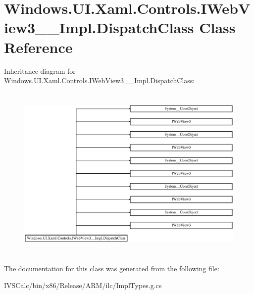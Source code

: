 \hypertarget{class_windows_1_1_u_i_1_1_xaml_1_1_controls_1_1_i_web_view3_____impl_1_1_dispatch_class}{}\section{Windows.\+U\+I.\+Xaml.\+Controls.\+I\+Web\+View3\+\_\+\+\_\+\+Impl.\+Dispatch\+Class Class Reference}
\label{class_windows_1_1_u_i_1_1_xaml_1_1_controls_1_1_i_web_view3_____impl_1_1_dispatch_class}
Inheritance diagram for Windows.\+U\+I.\+Xaml.\+Controls.\+I\+Web\+View3\+\_\+\+\_\+\+Impl.\+Dispatch\+Class\+:\begin{figure}[H]
\begin{center}
\leavevmode
\includegraphics[height=8.676057cm]{class_windows_1_1_u_i_1_1_xaml_1_1_controls_1_1_i_web_view3_____impl_1_1_dispatch_class}
\end{center}
\end{figure}


The documentation for this class was generated from the following file\+:\begin{DoxyCompactItemize}
\item 
I\+V\+S\+Calc/bin/x86/\+Release/\+A\+R\+M/ilc/Impl\+Types.\+g.\+cs\end{DoxyCompactItemize}
